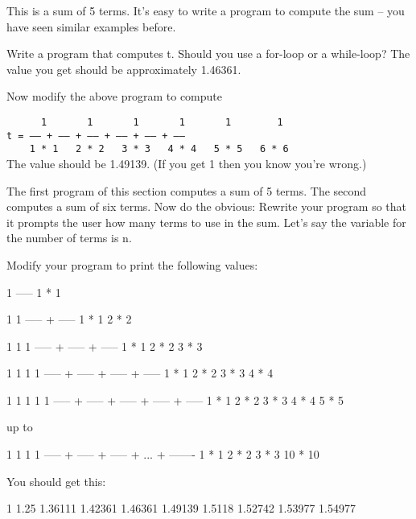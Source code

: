 This is a sum of 5 terms. It's easy to write a program
to compute the sum -- you have seen similar examples before.

\begin{ex} Write a program that computes t. Should you use a
for-loop or a while-loop? The value you get should be approximately
1.46361.
\end{ex}
\begin{ex} Now modify the above program to compute

\texttt{\ \ \ \ \ \ 1\ \ \ \ \ \ \ 1\ \ \ \ \ \ \ 1\ \ \ \ \ \ \ 1\ \ \ \ \ \ \ 1\ \ \ \ \ \ \ \ 1}\\
\texttt{t = ----- + ----- + ----- + ----- + ----- + -----}\\
\texttt{\ \ \ \ 1 * 1\ \ \ 2 * 2\ \ \ 3 * 3\ \ \ 4 * 4\ \ \ 5 * 5\ \ \ 6 * 6}\\

The value should be 1.49139. (If you get 1 then you know
you're wrong.)
\end{ex}

\begin{ex} The first program of this section computes a sum of 5
terms. The second computes a sum of six terms. Now do the obvious:
Rewrite your program so that it prompts the user how many terms to use
in the sum. Let's say the variable for the number of
terms is n.
\end{ex}
\begin{ex} Modify your program to print the following values:
\begin{console}
  1
-----
1 * 1

  1       1
----- + -----
1 * 1   2 * 2

  1       1       1
----- + ----- + -----
1 * 1   2 * 2   3 * 3

1         1       1       1
----- + ----- + ----- + -----
1 * 1   2 * 2   3 * 3   4 * 4

  1       1       1       1       1
----- + ----- + ----- + ----- + -----
1 * 1   2 * 2   3 * 3   4 * 4   5 * 5

up to

  1       1       1              1
----- + ----- + ----- + ... + -------
1 * 1   2 * 2   3 * 3         10 * 10
\end{console}
You should get this:

\begin{console}
1
1.25
1.36111
1.42361
1.46361
1.49139
1.5118
1.52742
1.53977
1.54977 
\end{console}
\end{ex}

